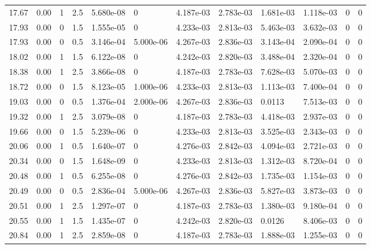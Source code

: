 \documentclass[preview]{standalone}
\begin{document}
{{{\begin{tabular}{L{1.2cm}C{1.2cm} C{0.3cm}C{0.5cm} C{1.4cm}C{1.4cm} C{1.4cm}C{1.4cm} C{1.6cm}C{1.6cm} C{1.6cm}C{1.6cm}}
  17.67  &  0.00  & 1     & 2.5 &  5.680e-08  & 0  &  4.187e-03&   2.783e-03& 1.681e-03 & 1.118e-03   &  0 & 0  \\ 
  17.93  &  0.00  & 0     & 1.5 &  1.555e-05  & 0  &  4.233e-03&   2.813e-03& 5.463e-03 & 3.632e-03   &  0 & 0  \\ 
  17.93  &  0.00  & 0     & 0.5 &  3.146e-04  & 5.000e-06  &  4.267e-03&   2.836e-03& 3.143e-04 & 2.090e-04   &  0 & 0  \\ 
  18.02  &  0.00  & 1     & 1.5 &  6.122e-08  & 0  &  4.242e-03&   2.820e-03& 3.488e-04 & 2.320e-04   &  0 & 0  \\ 
  18.38  &  0.00  & 1     & 2.5 &  3.866e-08  & 0  &  4.187e-03&   2.783e-03& 7.628e-03 & 5.070e-03   &  0 & 0  \\ 
  18.72  &  0.00  & 0     & 1.5 &  8.123e-05  & 1.000e-06  &  4.233e-03&   2.813e-03& 1.113e-03 & 7.400e-04   &  0 & 0  \\ 
  19.03  &  0.00  & 0     & 0.5 &  1.376e-04  & 2.000e-06  &  4.267e-03&   2.836e-03& 0.0113 & 7.513e-03   &  0 & 0  \\ 
  19.32  &  0.00  & 1     & 2.5 &  3.079e-08  & 0  &  4.187e-03&   2.783e-03& 4.418e-03 & 2.937e-03   &  0 & 0  \\ 
  19.66  &  0.00  & 0     & 1.5 &  5.239e-06  & 0  &  4.233e-03&   2.813e-03& 3.525e-03 & 2.343e-03   &  0 & 0  \\ 
  20.06  &  0.00  & 1     & 0.5 &  1.640e-07  & 0  &  4.276e-03&   2.842e-03& 4.094e-03 & 2.721e-03   &  0 & 0  \\ 
  20.34  &  0.00  & 0     & 1.5 &  1.648e-09  & 0  &  4.233e-03&   2.813e-03& 1.312e-03 & 8.720e-04   &  0 & 0  \\ 
  20.48  &  0.00  & 1     & 0.5 &  6.255e-08  & 0  &  4.276e-03&   2.842e-03& 1.735e-03 & 1.154e-03   &  0 & 0  \\ 
  20.49  &  0.00  & 0     & 0.5 &  2.836e-04  & 5.000e-06  &  4.267e-03&   2.836e-03& 5.827e-03 & 3.873e-03   &  0 & 0  \\ 
  20.51  &  0.00  & 1     & 2.5 &  1.297e-07  & 0  &  4.187e-03&   2.783e-03& 1.380e-03 & 9.180e-04   &  0 & 0  \\ 
  20.55  &  0.00  & 1     & 1.5 &  1.435e-07  & 0  &  4.242e-03&   2.820e-03& 0.0126 & 8.406e-03   &  0 & 0  \\ 
  20.84  &  0.00  & 1     & 2.5 &  2.859e-08  & 0  &  4.187e-03&   2.783e-03& 1.888e-03 & 1.255e-03   &  0 & 0  \\ 
\hline 
\end{tabular} 

}}}
\end{document}
